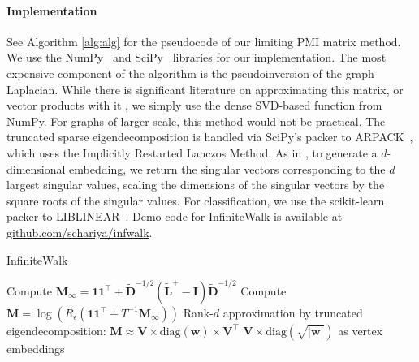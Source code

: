 \documentclass[sigconf]{acmart}
\newcommand{\mbf}[1]{\mathbf{#1}}
\begin{document}
\paragraph{Implementation} See Algorithm \ref{alg:alg} for the pseudocode of our limiting PMI matrix method. We use the NumPy~\cite{oliphant2006guide} and SciPy~\cite{scipy} libraries for our implementation. The most expensive component of the algorithm is the pseudoinversion of the graph Laplacian. While there is significant literature on approximating this matrix, or vector products with it \cite{spielman2004nearly,koutis2014approaching,kelner2013simple,ranjan2014incremental}, we simply use the dense SVD-based function from NumPy. For graphs of larger scale, this method would not be practical. The truncated sparse eigendecomposition is handled via SciPy's packer to ARPACK~\cite{lehoucq1998arpack}, which uses the Implicitly Restarted Lanczos Method. As in \cite{qiu2018network}, to generate a $d$-dimensional embedding, we return the singular vectors corresponding to the $d$ largest singular values, scaling the dimensions of the singular vectors by the square roots of the singular values. For classification, we use the scikit-learn~\cite{pedregosa2011scikit} packer to LIBLINEAR~\cite{fan2008liblinear}.
Demo code for InfiniteWalk is available at \href{https://www.github.com/schariya/infwalk}{github.com/schariya/infwalk}.

\begin{algorithm}
  \caption{InfiniteWalk}
  \begin{algorithmic}[1]
    \State Compute $\mbf{{M}_\infty} = \mbf{1}\mbf{1}^\top + \mbf{\tilde{D}}^{-1/2} \left( \mbf{\tilde{L}}^+ - \mbf{I} \right) \mbf{\tilde{D}}^{-1/2}$
    \State Compute $\mbf{M} = \log\left( R_\epsilon \left( \mbf{1}\mbf{1}^\top + T^{-1} \mbf{M_\infty} \right) \right)$
    \State Rank-$d$ approximation by truncated eigendecomposition: $\mbf{M} \approx \mbf{V} \times \text{diag}(\mbf{w}) \times \mbf{V}^\top$
    \State \Return $\mbf{V} \times \text{diag}(\sqrt{|\mbf{w}|})$ as vertex embeddings
  \end{algorithmic}\label{alg:alg}
\end{algorithm}
\end{document}
